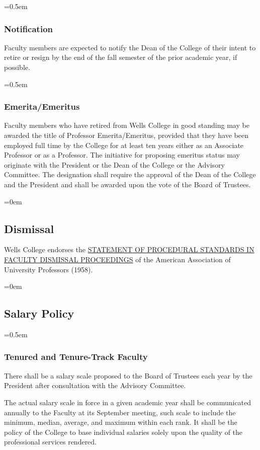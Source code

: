 \documentclass{manual}
\let\oldsubsection\subsection
\renewcommand\subsection{\leftskip=0em\oldsubsection}
\let\oldsubsubsection\subsubsection
\renewcommand\subsubsection{\leftskip=0.5em\oldsubsubsection}
\begin{document}
\subsubsection{Notification}
Faculty members are expected to notify the Dean of the College of their intent to retire or resign by the end of the fall semester of the prior academic year, if possible.


\subsubsection{Emerita/Emeritus}
Faculty members who have retired from Wells College in good standing may be awarded the title of Professor Emerita/Emeritus, provided that they have been employed full time by the College for at least ten years either as an Associate Professor or as a Professor. The initiative for proposing emeritus status may originate with the President or the Dean of the College or the Advisory Committee. The designation shall require the approval of the Dean of the College and the President and shall be awarded upon the vote of the Board of Trustees.


\subsection{Dismissal}\label{sec:Dismissal}
Wells College endorses the \href{http://www.aaup.org/AAUP/pubsres/policydocs/contents/statementon+proceduralstandardsinFaculty+dismissal+proceedings.htm}{STATEMENT OF PROCEDURAL STANDARDS IN FACULTY DISMISSAL PROCEEDINGS} of the American Association of University Professors (1958).


\subsection{Salary Policy}\label{sec:SalaryPolicy}

\subsubsection{Tenured and Tenure-Track Faculty}

There shall be a salary scale proposed to the Board of Trustees each year by the President after consultation with the Advisory Committee.

The actual salary scale in force in a given academic year shall be communicated annually to the Faculty at its September meeting, such scale to include the minimum, median, average, and maximum within each rank. It shall be the policy of the College to base individual salaries solely upon the quality of the professional services rendered. 
\end{document}
